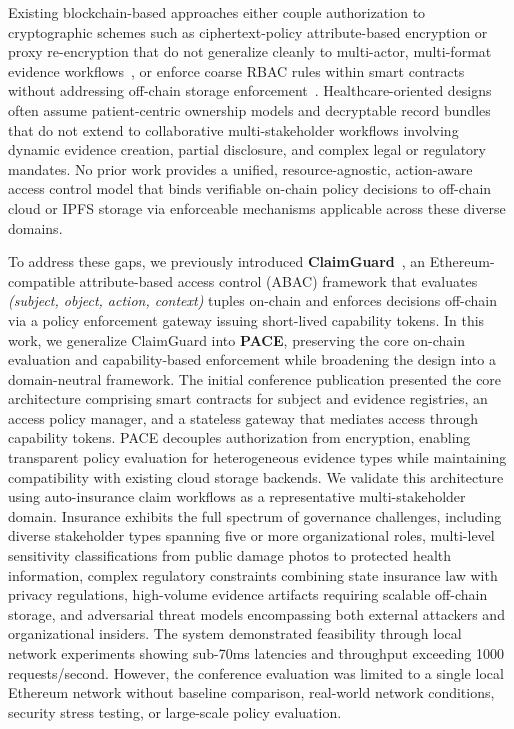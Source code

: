 \documentclass[pdflatex,sn-mathphys-num]{sn-jnl}
\begin{document}
Existing blockchain-based approaches either couple authorization to cryptographic schemes such as ciphertext-policy attribute-based encryption or proxy re-encryption that do not generalize cleanly to multi-actor, multi-format evidence workflows~\cite{sun2020insurance, liu2021auto}, or enforce coarse RBAC rules within smart contracts without addressing off-chain storage enforcement~\cite{raikwar2018insurance, tekale2023claims, theodouli2018healthcare}. Healthcare-oriented designs~\cite{sun2020emr, rana2022healthcare, liang2017mhealth} often assume patient-centric ownership models and decryptable record bundles that do not extend to collaborative multi-stakeholder workflows involving dynamic evidence creation, partial disclosure, and complex legal or regulatory mandates. No prior work provides a unified, resource-agnostic, action-aware access control model that binds verifiable on-chain policy decisions to off-chain cloud or IPFS storage via enforceable mechanisms applicable across these diverse domains.

To address these gaps, we previously introduced \textbf{ClaimGuard}~\cite{eneh2025claimguard}, an Ethereum-compatible attribute-based access control (ABAC) framework that evaluates \emph{(subject, object, action, context)} tuples on-chain and enforces decisions off-chain via a policy enforcement gateway issuing short-lived capability tokens. In this work, we generalize ClaimGuard into \textbf{PACE}, preserving the core on-chain evaluation and capability-based enforcement while broadening the design into a domain-neutral framework. The initial conference publication presented the core architecture comprising smart contracts for subject and evidence registries, an access policy manager, and a stateless gateway that mediates access through capability tokens. PACE decouples authorization from encryption, enabling transparent policy evaluation for heterogeneous evidence types while maintaining compatibility with existing cloud storage backends. We validate this architecture using auto-insurance claim workflows as a representative multi-stakeholder domain. Insurance exhibits the full spectrum of governance challenges, including diverse stakeholder types spanning five or more organizational roles, multi-level sensitivity classifications from public damage photos to protected health information, complex regulatory constraints combining state insurance law with privacy regulations, high-volume evidence artifacts requiring scalable off-chain storage, and adversarial threat models encompassing both external attackers and organizational insiders. The system demonstrated feasibility through local network experiments showing sub-70ms latencies and throughput exceeding 1000 requests/second. However, the conference evaluation was limited to a single local Ethereum network without baseline comparison, real-world network conditions, security stress testing, or large-scale policy evaluation.
\end{document}
